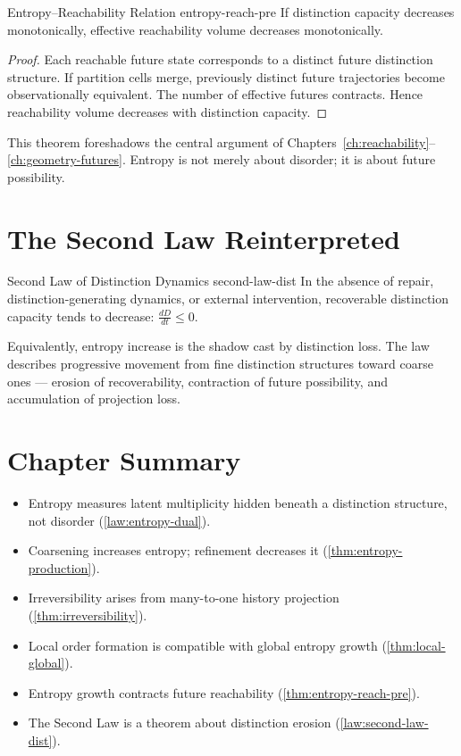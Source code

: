 \documentclass[12pt,twoside,openright]{book}
\newenvironment{chapsummary}{%
  \begin{tcolorbox}[colback=DistBlue!5,colframe=DistBlue,
    title={\faBookOpen\enspace Summary},
    fonttitle=\sffamily\bfseries\color{white},
    attach boxed title to top left={yshift=-2mm,xshift=4mm},
    boxed title style={colback=DistBlue,rounded corners}]
  \begin{itemize}[nosep,leftmargin=*]}{%
  \end{itemize}\end{tcolorbox}}
\begin{document}
\begin{theorem}{Entropy--Reachability Relation}%
  {entropy-reach-pre}
  If distinction capacity decreases monotonically,
  effective reachability volume decreases monotonically.
\end{theorem}

\begin{proof}
  Each reachable future state corresponds to a distinct
  future distinction structure. If partition cells merge,
  previously distinct future trajectories become
  observationally equivalent. The number of effective
  futures contracts. Hence reachability volume decreases
  with distinction capacity.
\end{proof}

This theorem foreshadows the central argument of
Chapters~\ref{ch:reachability}--\ref{ch:geometry-futures}.
Entropy is not merely about disorder; it is about future
possibility.

\section{The Second Law Reinterpreted}
\label{sec:ch3-second}

\begin{law}{Second Law of Distinction Dynamics}%
  {second-law-dist}
  In the absence of repair, distinction-generating
  dynamics, or external intervention, recoverable
  distinction capacity tends to decrease:
  $\frac{dD}{dt} \le 0$.
\end{law}

Equivalently, entropy increase is the shadow cast by
distinction loss. The law describes progressive movement
from fine distinction structures toward coarse ones —
erosion of recoverability, contraction of future
possibility, and accumulation of projection loss.

\section*{Chapter Summary}
\begin{chapsummary}
  \item Entropy measures latent multiplicity hidden beneath
        a distinction structure, not disorder
        (\cref{law:entropy-dual}).
  \item Coarsening increases entropy; refinement decreases
        it (\cref{thm:entropy-production}).
  \item Irreversibility arises from many-to-one history
        projection (\cref{thm:irreversibility}).
  \item Local order formation is compatible with global
        entropy growth (\cref{thm:local-global}).
  \item Entropy growth contracts future reachability
        (\cref{thm:entropy-reach-pre}).
  \item The Second Law is a theorem about distinction
        erosion (\cref{law:second-law-dist}).
\end{chapsummary}
\end{document}
